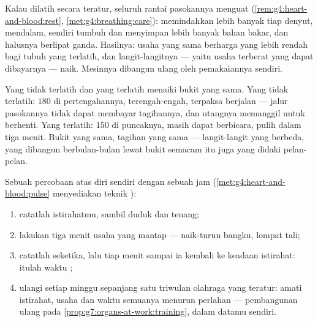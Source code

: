 \begin{proposition}\label{prop:g7:organs-at-work:training}
Kalau dilatih secara teratur, seluruh rantai pasokannya menguat
(\cref{rem:g4:heart-and-blood:rest},
\cref{met:g4:breathing:care}):  memindahkan lebih banyak
 tiap denyut,   mendalam,  sendiri tumbuh
dan menyimpan lebih banyak bahan bakar, dan  halusnya berlipat
ganda. Hasilnya: usaha yang sama berharga  yang lebih
rendah bagi tubuh yang terlatih, dan langit-langitnya --- yaitu usaha
terberat yang dapat dibayarnya --- naik. Mesinnya dibangun ulang oleh
pemakaiannya sendiri.
\end{proposition}
\admitted

\begin{example}\label{ex:g7:organs-at-work:runners}
Yang tidak terlatih dan yang terlatih menaiki bukit yang sama. Yang
tidak terlatih:  $180$ di pertengahannya, terengah-engah,
terpaksa berjalan --- jalur pasokannya tidak dapat membayar
tagihannya, dan utangnya memanggil untuk berhenti. Yang terlatih:
 $150$ di puncaknya, masih dapat berbicara, pulih dalam
tiga menit. Bukit yang sama, tagihan yang sama --- langit-langit yang
berbeda, yang dibangun berbulan-bulan lewat bukit semacam itu juga
yang didaki pelan-pelan.
\end{example}

\begin{method}\label{met:g7:organs-at-work:read}
Sebuah percobaan atas diri sendiri dengan sebuah jam
(\cref{met:g4:heart-and-blood:pulse} menyediakan teknik ):
\begin{enumerate}
  \item catatlah  istirahatmu, sambil duduk dan tenang;
  \item lakukan tiga menit usaha yang mantap --- naik-turun bangku,
        lompat tali;
  \item catatlah  seketika, lalu tiap menit sampai ia
        kembali ke keadaan istirahat: itulah waktu ;
  \item ulangi setiap minggu sepanjang satu triwulan olahraga yang
        teratur: amati  istirahat,  usaha dan
        waktu  semuanya menurun perlahan --- pembangunan
        ulang pada \cref{prop:g7:organs-at-work:training}, dalam
        datamu sendiri.
\end{enumerate}
\end{method}

